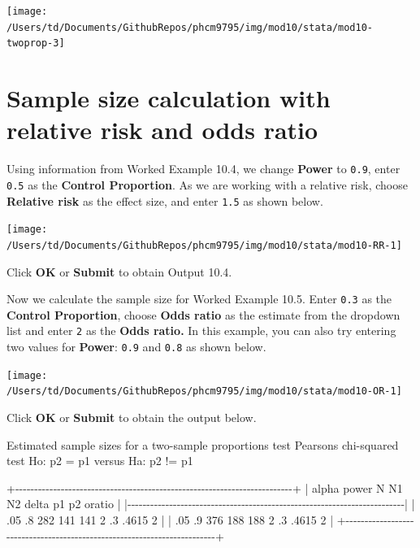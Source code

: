 \documentclass[
]{memoir}
\newenvironment{Shaded}{\begin{snugshade}}{\end{snugshade}}
\newcommand{\NormalTok}[1]{#1}
\begin{document}
\texttt{[image: /Users/td/Documents/GithubRepos/phcm9795/img/mod10/stata/mod10-twoprop-3]}

\hypertarget{sample-size-calculation-with-relative-risk-and-odds-ratio}{%
\section{Sample size calculation with relative risk and odds ratio}\label{sample-size-calculation-with-relative-risk-and-odds-ratio}}

Using information from Worked Example 10.4, we change \textbf{Power} to \texttt{0.9}, enter \texttt{0.5} as the \textbf{Control Proportion}. As we are working with a relative risk, choose \textbf{Relative risk} as the effect size, and enter \texttt{1.5} as shown below.

\texttt{[image: /Users/td/Documents/GithubRepos/phcm9795/img/mod10/stata/mod10-RR-1]}

Click \textbf{OK} or \textbf{Submit} to obtain Output 10.4.

Now we calculate the sample size for Worked Example 10.5. Enter \texttt{0.3} as the \textbf{Control Proportion}, choose \textbf{Odds ratio} as the estimate from the dropdown list and enter \texttt{2} as the \textbf{Odds ratio.} In this example, you can also try entering two values for \textbf{Power}: \texttt{0.9} and \texttt{0.8} as shown below.

\texttt{[image: /Users/td/Documents/GithubRepos/phcm9795/img/mod10/stata/mod10-OR-1]}

Click \textbf{OK} or \textbf{Submit} to obtain the output below.

\begin{Shaded}
\begin{Highlighting}[]
\NormalTok{Estimated sample sizes for a two{-}sample proportions test}
\NormalTok{Pearson\textquotesingle{}s chi{-}squared test }
\NormalTok{Ho: p2 = p1  versus  Ha: p2 != p1}

\NormalTok{  +{-}{-}{-}{-}{-}{-}{-}{-}{-}{-}{-}{-}{-}{-}{-}{-}{-}{-}{-}{-}{-}{-}{-}{-}{-}{-}{-}{-}{-}{-}{-}{-}{-}{-}{-}{-}{-}{-}{-}{-}{-}{-}{-}{-}{-}{-}{-}{-}{-}{-}{-}{-}{-}{-}{-}{-}{-}{-}{-}{-}{-}{-}{-}{-}{-}{-}{-}{-}{-}{-}{-}{-}{-}+}
\NormalTok{  |   alpha   power       N      N1      N2   delta      p1      p2  oratio |}
\NormalTok{  |{-}{-}{-}{-}{-}{-}{-}{-}{-}{-}{-}{-}{-}{-}{-}{-}{-}{-}{-}{-}{-}{-}{-}{-}{-}{-}{-}{-}{-}{-}{-}{-}{-}{-}{-}{-}{-}{-}{-}{-}{-}{-}{-}{-}{-}{-}{-}{-}{-}{-}{-}{-}{-}{-}{-}{-}{-}{-}{-}{-}{-}{-}{-}{-}{-}{-}{-}{-}{-}{-}{-}{-}{-}|}
\NormalTok{  |     .05      .8     282     141     141       2      .3   .4615       2 |}
\NormalTok{  |     .05      .9     376     188     188       2      .3   .4615       2 |}
\NormalTok{  +{-}{-}{-}{-}{-}{-}{-}{-}{-}{-}{-}{-}{-}{-}{-}{-}{-}{-}{-}{-}{-}{-}{-}{-}{-}{-}{-}{-}{-}{-}{-}{-}{-}{-}{-}{-}{-}{-}{-}{-}{-}{-}{-}{-}{-}{-}{-}{-}{-}{-}{-}{-}{-}{-}{-}{-}{-}{-}{-}{-}{-}{-}{-}{-}{-}{-}{-}{-}{-}{-}{-}{-}{-}+}
\end{Highlighting}
\end{Shaded}
\end{document}
